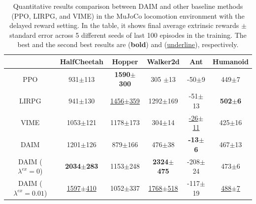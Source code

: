 \begin{table}[h!]
{\begin{tabular}{c|ccccc}
     \cmidrule(lr){2-6}
      & HalfCheetah & Hopper & Walker2d & Ant & Humanoid \\
    \midrule
    PPO & 931$\pm$113 & \textbf{1590$\pm$300} & 305 $\pm$13 & {-50$\pm$9} & 449$\pm$7 \\
    LIRPG & 941$\pm$130 & \underline{1456$\pm$359}& 1292$\pm$169 & -51$\pm$13 & \textbf{502$\pm$6}\\
    VIME  & 1053$\pm$121 & 1178$\pm$173 & 304$\pm$14 & \underline{-26$\pm$11} & 425$\pm$16 \\
    \midrule
    DAIM & 1201$\pm$126& 879$\pm$166 & 476$\pm$38 & \textbf{-13$\pm$6} & 467$\pm$13\\
    DAIM ($\lambda^{ex}=0$) & \textbf{2034$\pm$283} & 1153$\pm$248 & \textbf{2324$\pm$475} & -208$\pm$24 & 473$\pm$6\\
    DAIM ($\lambda^{ex}=0.01$) & \underline{1597$\pm$410} & 1052$\pm$337 & \underline{1768$\pm$518}& -117$\pm$19 & \underline{488$\pm$7}\\
    \bottomrule
    \end{tabular}}
    \caption{Quantitative results comparison between DAIM and other baseline methods (PPO, LIRPG, and VIME) in the MuJoCo locomotion environment with the delayed reward setting. In the table, it shows final average extrinsic rewards $\pm$ standard error across 5 different seeds of last 100 episodes in the training. The best and the second best results are (\textbf{bold}) and (\underline{underline}), respectively.}
    \label{tab:delay}
\end{table}


